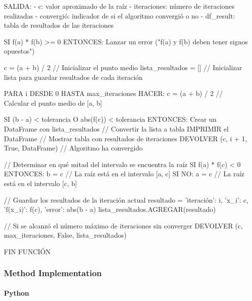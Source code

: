 \documentclass{article}
\begin{document}
            SALIDA:
            - c: valor aproximado de la raíz
            - iteraciones: número de iteraciones realizadas
            - convergió: indicador de si el algoritmo convergió o no
            - df_result: tabla de resultados de las iteraciones

            SI f(a) * f(b) >= 0 ENTONCES:
                Lanzar un error ("f(a) y f(b) deben tener signos opuestos")

            c = (a + b) / 2  // Inicializar el punto medio
            lista_resultados = []  // Inicializar lista para guardar resultados de cada iteración

            PARA i DESDE 0 HASTA max_iteraciones HACER:
                c = (a + b) / 2  // Calcular el punto medio de [a, b]

                SI (b - a) < tolerancia O abs(f(c)) < tolerancia ENTONCES:
                    Crear un DataFrame con lista_resultados  // Convertir la lista a tabla
                    IMPRIMIR el DataFrame  // Mostrar tabla con resultados de iteraciones
                    DEVOLVER (c, i + 1, True, DataFrame)  // Algoritmo ha convergido

                // Determinar en qué mitad del intervalo se encuentra la raíz
                SI f(a) * f(c) < 0 ENTONCES:
                    b = c  // La raíz está en el intervalo [a, c]
                SI NO:
                    a = c  // La raíz está en el intervalo [c, b]

                // Guardar los resultados de la iteración actual
                resultado = { 'iteración': i, 'x_i': c, 'f(x_i)': f(c), 'error': abs(b - a) }
                lista_resultados.AGREGAR(resultado)

            // Si se alcanzó el número máximo de iteraciones sin converger
            DEVOLVER (c, max_iteraciones, False, lista_resultados)

        FIN FUNCIÓN

    \subsubsection{Method Implementation}
    \paragraph{Python}
\end{document}
